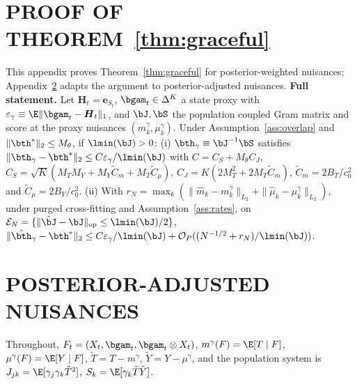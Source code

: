 \section{PROOF OF THEOREM~\ref{thm:graceful}}
\label{app:proof_thm3}
This appendix proves Theorem~\ref{thm:graceful} for posterior-weighted nuisances; Appendix~\ref{app:pa} adapts the argument to posterior-adjusted nuisances. \textbf{Full statement.} Let $\boldsymbol{H}_t = \boldsymbol{e}_{S_t}$, $\bgam_t \in \Delta^K$ a state proxy with $\varepsilon_\gamma \equiv \E\|\bgam_t - \boldsymbol{H}_t\|_1$, and $\bJ, \bS$ the population coupled Gram matrix and score at the proxy nuisances $(m_k^\gamma, \mu_k^\gamma)$. Under Assumption~\ref{ass:overlap} and $\|\bth^*\|_2 \le M_\theta$, if $\lmin(\bJ) > 0$:
(i) $\bth_\gamma \equiv \bJ^{-1}\bS$ satisfies $\|\bth_\gamma - \bth^*\|_2 \le C\varepsilon_\gamma/\lmin(\bJ)$ with $C = C_S + M_\theta C_J$, $C_S = \sqrt{K}(M_T M_Y + M_Y \tilde{C}_m + M_T \tilde{C}_\mu)$, $C_J = K(2M_T^2 + 2M_T \tilde{C}_m)$, $\tilde{C}_m = 2B_T/c_0^2$ and $\tilde{C}_\mu = 2B_Y/c_0^2$.
(ii) With $r_N = \max_k(\|\hat{m}_k - m_k^\gamma\|_{L_2} + \|\hat{\mu}_k - \mu_k^\gamma\|_{L_2})$, under purged cross-fitting and Assumption~\ref{ass:rates}, on $\mathcal{E}_N = \{\|\hat{\bJ} - \bJ\|_{\rm op} \le \lmin(\bJ)/2\}$, $\|\hat{\bth}_\gamma - \bth^*\|_2 \le C\varepsilon_\gamma/\lmin(\bJ) + \mathcal{O}_P((N^{-1/2} + r_N)/\lmin(\bJ))$.


\section{POSTERIOR-ADJUSTED NUISANCES}
\label{app:pa}
Throughout, $F_t=(X_t,\bgam_t,\bgam_t\otimes X_t)$, $m^\gamma(F)=\E[T\mid F]$, $\mu^\gamma(F)=\E[Y\mid F]$, $\tilde T=T-m^\gamma$, $\tilde Y=Y-\mu^\gamma$, and the population system is $J_{jk}=\E[\gamma_j\gamma_k\tilde T^2]$, $S_k=\E[\gamma_k\tilde T\tilde Y]$.

